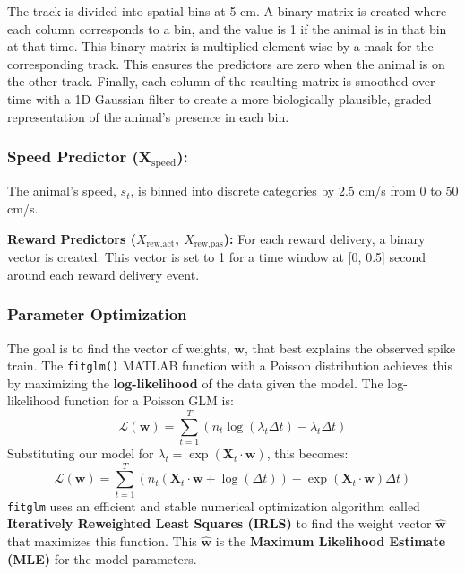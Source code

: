 The track is divided into spatial bins at 5 cm. A binary matrix is created where each column corresponds to a bin, and the value is 1 if the animal is in that bin at that time.
This binary matrix is multiplied element-wise by a mask for the corresponding track. This ensures the predictors are zero when the animal is on the other track.
Finally, each column of the resulting matrix is smoothed over time with a 1D Gaussian filter to create a more biologically plausible, graded representation of the animal's presence in each bin.
 
\subsubsection{\textbf{Speed Predictor ($\mathbf{X}_{\text{speed}}$):}}
The animal's speed, $s_t$, is binned into discrete categories by 2.5 cm/s from 0 to 50 cm/s.

\textbf{Reward Predictors ($X_{\text{rew,act}}$, $X_{\text{rew,pas}}$):}
For each reward delivery, a binary vector is created. This vector is set to 1 for a time window at [0, 0.5] second around each reward delivery event.


\subsubsection*{Parameter Optimization}

The goal is to find the vector of weights, $\mathbf{w}$, that best explains the observed spike train. The \texttt{fitglm()} MATLAB function with a Poisson distribution achieves this by maximizing the \textbf{log-likelihood} of the data given the model. The log-likelihood function for a Poisson GLM is:
\begin{equation}
\mathcal{L}(\mathbf{w}) = \sum_{t=1}^{T} \left( n_t \log(\lambda_t \Delta t) - \lambda_t \Delta t \right)
\end{equation}
Substituting our model for $\lambda_t = \exp(\mathbf{X}_t \cdot \mathbf{w})$, this becomes:
\begin{equation}
\mathcal{L}(\mathbf{w}) = \sum_{t=1}^{T} \left( n_t (\mathbf{X}_t \cdot \mathbf{w} + \log(\Delta t)) - \exp(\mathbf{X}_t \cdot \mathbf{w}) \Delta t \right)
\end{equation}
\texttt{fitglm} uses an efficient and stable numerical optimization algorithm called \textbf{Iteratively Reweighted Least Squares (IRLS)} to find the weight vector $\hat{\mathbf{w}}$ that maximizes this function. This $\hat{\mathbf{w}}$ is the \textbf{Maximum Likelihood Estimate (MLE)} for the model parameters.

